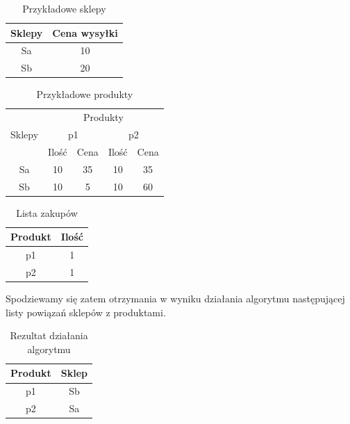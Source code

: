 \documentclass[a4paper]{article}
\begin{document}
\begin{table}[H]
\renewcommand{\arraystretch}{1.3}
\centering
\caption{Przykładowe sklepy}
\begin{tabular}{|c|c|}
\hline
Sklepy & Cena wysyłki \\ \hline
Sa     & 10           \\ \hline
Sb     & 20           \\ \hline
\end{tabular}
\end{table}

\begin{table}[H]
\renewcommand{\arraystretch}{1.3}
\centering
\caption{Przykładowe produkty}
\begin{tabular}{|c|c|c|c|c|}
\hline
\multirow{3}{*}{Sklepy} & \multicolumn{4}{c|}{Produkty}                     \\ \cline{2-5} 
                        & \multicolumn{2}{c|}{p1} & \multicolumn{2}{c|}{p2} \\ \cline{2-5} 
                        & Ilość       & Cena      & Ilość       & Cena      \\ \hline
Sa                      & 10          & 35        & 10          & 35        \\ \hline
Sb                      & 10          & 5         & 10          & 60        \\ \hline
\end{tabular}
\end{table}

\begin{table}[H]
\renewcommand{\arraystretch}{1.3}
\centering
\caption{Lista zakupów}
\begin{tabular}{|c|c|}
\hline
Produkt & Ilość \\ \hline
p1      & 1     \\ \hline
p2      & 1     \\ \hline
\end{tabular}
\end{table}

Spodziewamy się zatem otrzymania w wyniku działania algorytmu następującej listy powiązań sklepów z produktami.

\begin{table}[H]
\renewcommand{\arraystretch}{1.3}
\centering
\caption{Rezultat działania algorytmu}
\begin{tabular}{|c|c|}
\hline
Produkt & Sklep \\ \hline
p1      & Sb    \\ \hline
p2      & Sa    \\ \hline
\end{tabular}
\end{table}
\end{document}
